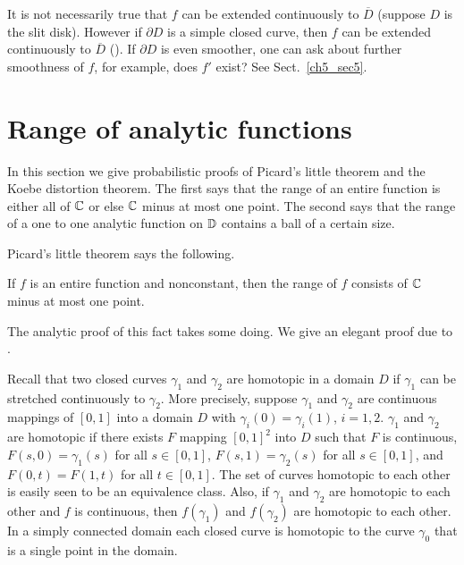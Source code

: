 
It is not necessarily true that $f$ can be extended continuously to $\overline{D}$ (suppose $D$ is the slit disk). However if $\partial D$ is a simple closed curve, then $f$ can be extended continuously to $\overline{D}$ (\cite{Pommerenke1975}). If $\partial D$ is even smoother, one can ask about further smoothness of $f$, for example, does $f'$ exist? See Sect.\ \ref{ch5_sec5}.

\section{Range of analytic functions}\label{ch5_sec2}

In this section we give probabilistic proofs of Picard's little theorem and the Koebe distortion theorem. The first says that the range of an entire function is either all of $\mathbb{C}$ or else $\mathbb{C}$ minus at most one point. The second says that the range of a one to one analytic function on $\mathbb{D}$ contains a ball of a certain size.


Picard's little theorem says the following.

\begin{theorem}\label{thm:ch5_2.1}
If $f$ is an entire function and nonconstant, then the range of $f$ consists of $\mathbb{C}$ minus at most one point.
\end{theorem}

The analytic proof of this fact takes some doing. We give an elegant proof due to \cite{Davis1975}.

Recall that two closed curves $\gamma_1$ and $\gamma_2$ are homotopic in a domain $D$ if $\gamma_1$ can be stretched continuously to $\gamma_2$. More precisely, suppose $\gamma_1$ and $\gamma_2$ are continuous mappings of $[0,1]$ into a domain $D$ with $\gamma_i(0) = \gamma_i(1)$, $i = 1,2$. $\gamma_1$ and $\gamma_2$ are homotopic if there exists $F$ mapping $[0,1]^2$ into $D$ such that $F$ is continuous, $F(s,0) = \gamma_1(s)$ for all $s \in [0,1]$, $F(s,1) = \gamma_2(s)$ for all $s \in [0,1]$, and $F(0,t) = F(1,t)$ for all $t \in [0,1]$. The set of curves homotopic to each other is easily seen to be an equivalence class. Also, if $\gamma_1$ and $\gamma_2$ are homotopic to each other and $f$ is continuous, then $f(\gamma_1)$ and $f(\gamma_2)$ are homotopic to each other. In a simply connected domain each closed curve is homotopic to the curve $\gamma_0$ that is a single point in the domain.

